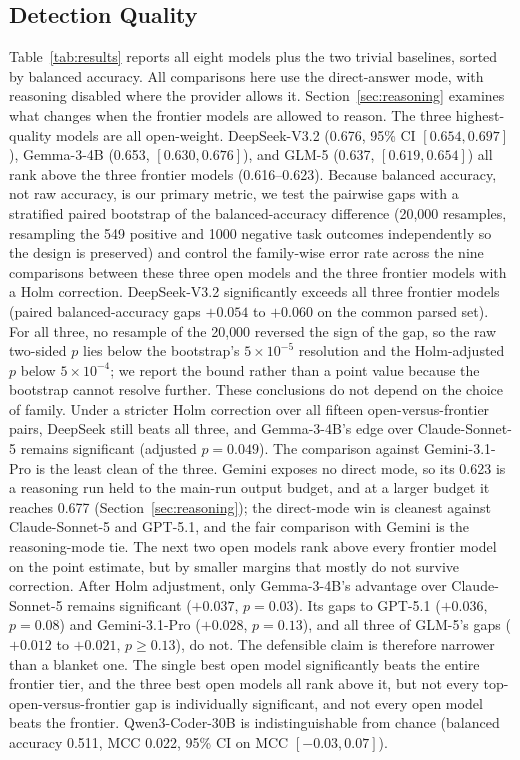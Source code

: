 \documentclass[computers,article,submit,moreauthors]{Definitions/mdpi}
\begin{document}
\subsection{Detection Quality}\label{sec:quality}
Table~\ref{tab:results} reports all eight models plus the two trivial baselines, sorted by balanced accuracy. All comparisons here use the direct-answer mode, with reasoning disabled where the provider allows it. Section~\ref{sec:reasoning} examines what changes when the frontier models are allowed to reason. The three highest-quality models are all open-weight. DeepSeek-V3.2 (0.676, 95\% CI $[0.654, 0.697]$), Gemma-3-4B (0.653, $[0.630, 0.676]$), and GLM-5 (0.637, $[0.619, 0.654]$) all rank above the three frontier models (0.616--0.623). Because balanced accuracy, not raw accuracy, is our primary metric, we test the pairwise gaps with a stratified paired bootstrap of the balanced-accuracy difference (20{,}000 resamples, resampling the 549 positive and 1000 negative task outcomes independently so the design is preserved) and control the family-wise error rate across the nine comparisons between these three open models and the three frontier models with a Holm correction. DeepSeek-V3.2 significantly exceeds all three frontier models (paired balanced-accuracy gaps $+0.054$ to $+0.060$ on the common parsed set). For all three, no resample of the 20{,}000 reversed the sign of the gap, so the raw two-sided $p$ lies below the bootstrap's $5\times10^{-5}$ resolution and the Holm-adjusted $p$ below $5\times10^{-4}$; we report the bound rather than a point value because the bootstrap cannot resolve further. These conclusions do not depend on the choice of family. Under a stricter Holm correction over all fifteen open-versus-frontier pairs, DeepSeek still beats all three, and Gemma-3-4B's edge over Claude-Sonnet-5 remains significant (adjusted $p=0.049$). The comparison against Gemini-3.1-Pro is the least clean of the three. Gemini exposes no direct mode, so its 0.623 is a reasoning run held to the main-run output budget, and at a larger budget it reaches 0.677 (Section~\ref{sec:reasoning}); the direct-mode win is cleanest against Claude-Sonnet-5 and GPT-5.1, and the fair comparison with Gemini is the reasoning-mode tie. The next two open models rank above every frontier model on the point estimate, but by smaller margins that mostly do not survive correction. After Holm adjustment, only Gemma-3-4B's advantage over Claude-Sonnet-5 remains significant ($+0.037$, $p=0.03$). Its gaps to GPT-5.1 ($+0.036$, $p=0.08$) and Gemini-3.1-Pro ($+0.028$, $p=0.13$), and all three of GLM-5's gaps ($+0.012$ to $+0.021$, $p\geq0.13$), do not. The defensible claim is therefore narrower than a blanket one. The single best open model significantly beats the entire frontier tier, and the three best open models all rank above it, but not every top-open-versus-frontier gap is individually significant, and not every open model beats the frontier. Qwen3-Coder-30B is indistinguishable from chance (balanced accuracy 0.511, MCC 0.022, 95\% CI on MCC $[-0.03, 0.07]$).
\end{document}
